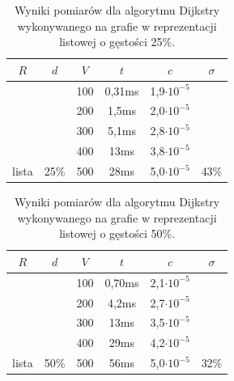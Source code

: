 \documentclass[a4paper,12pt]{article}
\begin{document}
\begin{table}[H]
	\centering
	\caption{\centering Wyniki pomiarów dla algorytmu Dijkstry wykonywanego na grafie w reprezentacji listowej o gęstości 25\%.}
	\begin{tabular}{|c|c|c|c|c|c|}
		\hline
		\rowcolor[HTML]{C0C0C0} 
		$R$                       & $d$                    & $V$ & $t$    & $c$                & $\sigma$               \\ \hline
		&                        & 100 & 0,31ms & 1,9$\cdot 10^{-5}$ &                        \\ \cline{3-5}
		&                        & 200 & 1,5ms  & 2,0$\cdot 10^{-5}$ &                        \\ \cline{3-5}
		&                        & 300 & 5,1ms  & 2,8$\cdot 10^{-5}$ &                        \\ \cline{3-5}
		&                        & 400 & 13ms   & 3,8$\cdot 10^{-5}$ &                        \\ \cline{3-5}
		\multirow{-5}{*}{lista} & \multirow{-5}{*}{25\%} & 500 & 28ms   & 5,0$\cdot 10^{-5}$ & \multirow{-5}{*}{43\%} \\ \hline
	\end{tabular}
\end{table}

\begin{table}[H]
	\centering
	\caption{\centering Wyniki pomiarów dla algorytmu Dijkstry wykonywanego na grafie w reprezentacji listowej o gęstości 50\%.}
	\begin{tabular}{|c|c|c|c|c|c|}
		\hline
		\rowcolor[HTML]{C0C0C0} 
		$R$                       & $d$                    & $V$ & $t$    & $c$                & $\sigma$               \\ \hline
		&                        & 100 & 0,70ms & 2,1$\cdot 10^{-5}$ &                        \\ \cline{3-5}
		&                        & 200 & 4,2ms  & 2,7$\cdot 10^{-5}$ &                        \\ \cline{3-5}
		&                        & 300 & 13ms   & 3,5$\cdot 10^{-5}$ &                        \\ \cline{3-5}
		&                        & 400 & 29ms   & 4,2$\cdot 10^{-5}$ &                        \\ \cline{3-5}
		\multirow{-5}{*}{lista} & \multirow{-5}{*}{50\%} & 500 & 56ms   & 5,0$\cdot 10^{-5}$ & \multirow{-5}{*}{32\%} \\ \hline
	\end{tabular}
\end{table}
\end{document}

